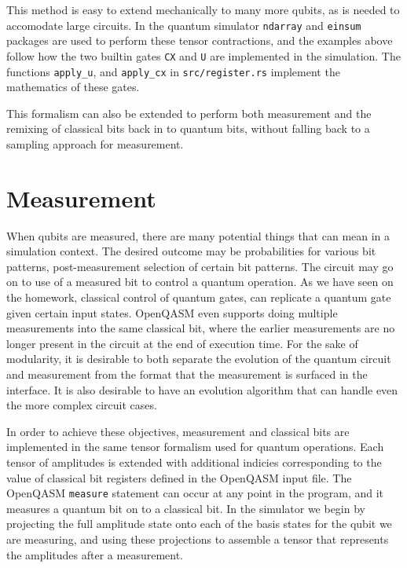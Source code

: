 \documentclass[%
 reprint,
 amsmath,amssymb,
 aps,
]{revtex4-2}
\begin{document}
This method is easy to extend mechanically to many more qubits, as is needed to accomodate large circuits. In the quantum simulator \texttt{ndarray} and \texttt{einsum} packages are used to perform these tensor contractions, and the examples above follow how the two builtin gates \texttt{CX} and \texttt{U} are implemented in the simulation. The functions \texttt{apply\_u}, and \texttt{apply\_cx} in \texttt{src/register.rs} implement the mathematics of these gates. 

This formalism can also be extended to perform both measurement and the remixing of classical bits back in to quantum bits, without falling back to a sampling approach for measurement.


\section{\label{sec:level1} Measurement}
When qubits are measured, there are many potential things that can mean in a simulation context. The desired outcome may be probabilities for various bit patterns, post-measurement selection of certain bit patterns. The circuit may go on to use of a measured bit to control a quantum operation. As we have seen on the homework, classical control of quantum gates, can replicate a quantum gate given certain input states. OpenQASM even supports doing multiple measurements into the same classical bit, where the earlier measurements are no longer present in the circuit at the end of execution time. For the sake of modularity, it is desirable to both separate the evolution of the quantum circuit and measurement from the format that the measurement is surfaced in the interface. It is also desirable to have an evolution algorithm that can handle even the more complex circuit cases.

In order to achieve these objectives, measurement and classical bits are implemented in the same tensor formalism used for quantum operations. Each tensor of amplitudes is extended with additional indicies corresponding to the value of classical bit registers defined in the OpenQASM input file. The OpenQASM \texttt{measure} statement can occur at any point in the program, and it measures a quantum bit on to a classical bit. In the simulator we begin by projecting the full amplitude state onto each of the basis states for the qubit we are measuring, and using these projections to assemble a tensor that represents the amplitudes after a measurement.
\end{document}
